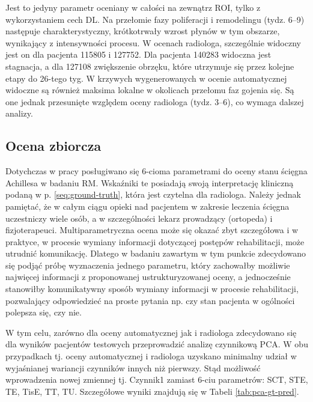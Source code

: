 Jest to jedyny parametr oceniany w całości na zewnątrz ROI, tylko z wykorzystaniem cech DL. Na przełomie fazy poliferacji i remodelingu (tydz. 6--9) następuje charakterystyczny, krótkotrwały wzrost płynów w tym obszarze, wynikający z intensywności procesu. W ocenach radiologa, szczególnie widoczny jest on dla pacjenta 115805 i 127752. Dla pacjenta 140283 widoczna jest stagnacja, \linebreak a dla 127108 zwiększenie obrzęku, które utrzymuje się przez kolejne etapy do 26-tego tyg. W krzywych wygenerowanych w ocenie automatycznej widoczne są również maksima lokalne w okolicach przełomu faz gojenia się. Są one jednak przesunięte względem oceny radiologa (tydz. 3--6), co wymaga dalszej analizy.

\subsection{Ocena zbiorcza}
\label{seq:achilles-score}
Dotychczas w pracy posługiwano się 6-cioma parametrami do oceny stanu ścięgna Achillesa w badaniu RM. Wskaźniki te posiadają swoją interpretację kliniczną podaną w p. \ref{seq:ground-truth}, która jest czytelna dla radiologa. Należy jednak pamiętać, że w całym ciągu opieki nad pacjentem w zakresie leczenia ścięgna uczestniczy wiele osób, a w szczególności lekarz prowadzący (ortopeda) i fizjoterapeuci. Multiparametryczna ocena może się okazać zbyt szczegółowa i w praktyce, w procesie wymiany informacji dotyczącej postępów rehabilitacji, może utrudnić komunikację. Dlatego w badaniu zawartym w tym punkcie zdecydowano się podjąć próbę wyznaczenia jednego parametru, który zachowałby możliwie najwięcej informacji z proponowanej ustrukturyzowanej oceny, a jednocześnie stanowiłby komunikatywny sposób wymiany informacji w procesie rehabilitacji, pozwalający odpowiedzieć na proste pytania np. czy stan pacjenta w ogólności polepsza się, czy nie. 

W tym celu, zarówno dla oceny automatycznej jak i radiologa zdecydowano się dla wyników pacjentów testowych przeprowadzić analizę czynnikową PCA. W obu przypadkach tj. oceny automatycznej i radiologa uzyskano minimalny udział w wyjaśnianej wariancji czynników innych niż pierwszy. Stąd możliwość wprowadzenia nowej zmiennej tj. Czynnik1 zamiast 6-ciu parametrów: SCT, STE, TE, TisE, TT, TU. Szczegółowe wyniki znajdują się w Tabeli \ref{tab:pca-gt-pred}.

